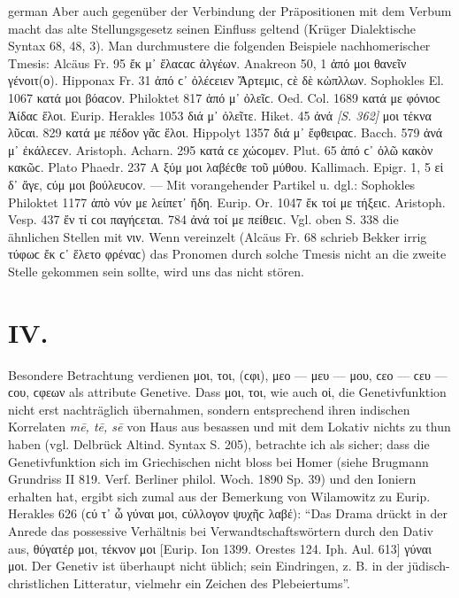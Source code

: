 \begin{otherlanguage*}{german}
\hspace*{-1.5mm}Aber auch gegenüber der Verbindung der Prä\-po\-si\-ti\-o\-nen mit dem Ver\-bum macht das alte Stellungsgesetz seinen Einfluss geltend (Krüger Dialektische Syntax 68, 48, 3). Man durchmustere die folgenden Beispiele nachhomerischer Tmesis: Alcäus Fr. 95 ἔκ μ᾽ ἔλαϲαϲ ἀλγέων. Anakreon 50, 1 ἀπό μοι θανεῖν γένοιτ(ο). Hipponax Fr. 31 ἀπό ϲ᾽ ὀλέϲειεν Ἄρτεμιϲ, ϲὲ δὲ κὠπλλων. Sophokles El. 1067 κατά μοι βόαϲον. Philoktet 817 ἀπό μ᾽ ὀλεῖϲ. Oed. Col. 1689 κατά με φόνιοϲ Ἀίδαϲ ἕλοι. Eurip. Herakles 1053 διά μ᾽ ὀλεῖτε. Hiket. 45 ἀνά \hypertarget{p362}{\emph{[S. 362]}}\label{p362} μοι τέκνα λῦϲαι. 829 κατά με πέδον γᾶϲ ἕλοι. Hippolyt 1357 διά μ᾽ ἔφθειραϲ. Bacch. 579 ἀνά μ᾽ ἐκάλεϲεν. Aristoph. Acharn. 295 κατά ϲε χώϲομεν. Plut. 65 ἀπό ϲ᾽ ὀλῶ κακὸν κακῶϲ. Plato Phaedr. 237 Α ξύμ μοι λαβέϲθε τοῦ μύθου. Kallimach. Epigr. 1, 5 εἰ δ᾽ ἄγε, ϲύμ μοι βούλευϲον. — Mit vorangehender Partikel u. dgl.: Sophokles Philoktet 1177 ἀπὸ νύν με λείπετ᾽ ἤδη. Eurip. Or. 1047 ἔκ τοί με τήξειϲ. Aristoph. Vesp. 437 ἔν τί ϲοι παγήϲεται. 784 ἀνά τοί με πείθειϲ. Vgl. oben S. 338 die ähnlichen Stellen mit νιν. Wenn vereinzelt (Alcäus Fr. 68 schrieb Bekker irrig τύφωϲ ἔκ ϲ᾽ ἕλετο φρέναϲ) das Pronomen durch solche Tmesis nicht an die zweite Stelle gekommen sein sollte, wird uns das nicht stören.

\section*{IV.}

Besondere Betrachtung verdienen μοι, τοι, (ϲφι), μεο — μευ — μου, ϲεο — ϲευ — ϲου, ϲφεων als attribute Genetive. Dass μοι, τοι, wie auch οἱ, die Genetivfunktion nicht erst nachträglich übernahmen, sondern entsprechend ihren indischen Korrelaten \emph{mē, tē, sē} von Haus aus besassen und mit dem Lokativ nichts zu thun haben (vgl. Delbrück Altind. Syntax S. 205), betrachte ich als sicher; dass die Genetivfunktion sich im Griechischen nicht bloss bei Homer (siehe Brugmann Grundriss II 819. Verf. Berliner philol. Woch. 1890 Sp. 39) und den Ioniern erhalten hat, ergibt sich zumal aus der Bemerkung von Wilamowitz zu Eurip. Herakles 626 (ϲύ τ᾽ ὦ γύναι μοι, ϲύλλογον ψυχῆϲ λαβέ): “Das Drama drückt in der Anrede das possessive Verhältnis bei Verwandtschaftswörtern durch den Dativ aus, θύγατέρ μοι, τέκνον μοι [Eurip. Ion 1399. Orestes 124. Iph. Aul. 613] γύναι μοι. Der Genetiv ist überhaupt nicht üblich; sein Eindringen, z. B. in der jüdisch-christlichen Litteratur, vielmehr ein Zeichen des Plebeiertums”.


\end{otherlanguage*}
